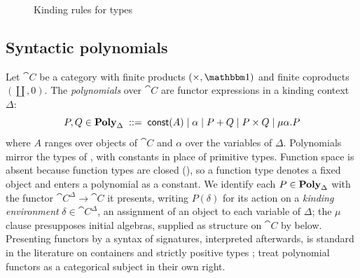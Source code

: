 \begin{figure}
\caption{Kinding rules for types}
\label{fig:polynomial-types:kinding}
\end{figure}

\subsection{Syntactic polynomials}
\label{sec:polynomial-types:poly}

Let $\cat{C}$ be a category with finite products $(\times, \One)$ and finite coproducts
$(\coprod, 0)$. The \emph{polynomials} over $\cat{C}$ are functor expressions in a kinding context
$\Delta$:
\[
  P, Q \in \mathbf{Poly}_\Delta \;::=\; \mathsf{const}(A) \mid \alpha \mid P + Q \mid P \times Q \mid \mu\alpha.P
\]
where $A$ ranges over objects of $\cat{C}$ and $\alpha$ over the variables of $\Delta$.
Polynomials mirror the types of , with constants in place of primitive
types. Function space is absent because function types are closed (),
so a function type denotes a fixed object and enters a polynomial as a constant. We identify each $P
\in \mathbf{Poly}_\Delta$ with the functor $\cat{C}^\Delta \to \cat{C}$ it presents, writing $P(\delta)$ for
its action on a \emph{kinding environment} $\delta \in \cat{C}^\Delta$, an assignment of an object to
each variable of $\Delta$; the $\mu$ clause presupposes initial algebras, supplied as structure on
$\cat{C}$ by  below. Presenting functors by a syntax of signatures,
interpreted afterwards, is standard in the literature on containers and strictly positive types
\citep{abbott2005}; \citet{gambino-kock} treat polynomial functors as a categorical subject in their
own right.

